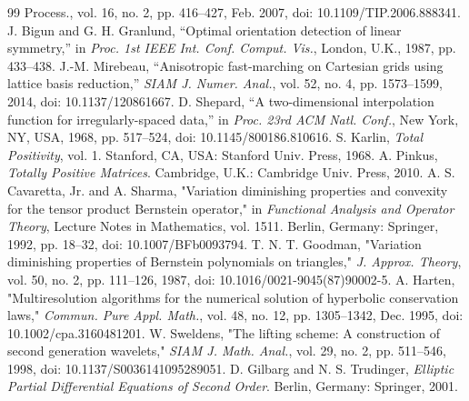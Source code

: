 \documentclass[journal]{IEEEtran}
\begin{document}
\begin{thebibliography}{99}
{Process.}, vol. 16, no. 2, pp. 416--427, Feb. 2007,
doi: 10.1109/TIP.2006.888341.
J. Bigun and G. H. Granlund, ``Optimal orientation detection of linear
symmetry,'' in \emph{Proc. 1st IEEE Int. Conf. Comput. Vis.}, London, U.K.,
1987, pp. 433--438.
J.-M. Mirebeau, ``Anisotropic fast-marching on Cartesian grids using lattice
basis reduction,'' \emph{SIAM J. Numer. Anal.}, vol. 52, no. 4,
pp. 1573--1599, 2014, doi: 10.1137/120861667.
D. Shepard, ``A two-dimensional interpolation function for irregularly-spaced
data,'' in \emph{Proc. 23rd ACM Natl. Conf.}, New York, NY, USA, 1968,
pp. 517--524, doi: 10.1145/800186.810616.
S. Karlin, \emph{Total Positivity}, vol. 1. Stanford, CA, USA: Stanford
Univ. Press, 1968.
A. Pinkus, \emph{Totally Positive Matrices}. Cambridge, U.K.: Cambridge
Univ. Press, 2010.
A. S. Cavaretta, Jr. and A. Sharma, "Variation diminishing properties and
convexity for the tensor product Bernstein operator," in \emph{Functional
Analysis and Operator Theory}, Lecture Notes in Mathematics, vol. 1511.
Berlin, Germany: Springer, 1992, pp. 18--32,
doi: 10.1007/BFb0093794.
T. N. T. Goodman, "Variation diminishing properties of Bernstein
polynomials on triangles," \emph{J. Approx. Theory}, vol. 50, no. 2,
pp. 111--126, 1987, doi: 10.1016/0021-9045(87)90002-5.
A. Harten, "Multiresolution algorithms for the numerical solution of
hyperbolic conservation laws," \emph{Commun. Pure Appl. Math.}, vol. 48,
no. 12, pp. 1305--1342, Dec. 1995,
doi: 10.1002/cpa.3160481201.
W. Sweldens, "The lifting scheme: A construction of second generation
wavelets," \emph{SIAM J. Math. Anal.}, vol. 29, no. 2, pp. 511--546, 1998,
doi: 10.1137/S0036141095289051.
D. Gilbarg and N. S. Trudinger, \emph{Elliptic Partial Differential Equations
of Second Order}. Berlin, Germany: Springer, 2001.
\end{thebibliography}
\end{document}

